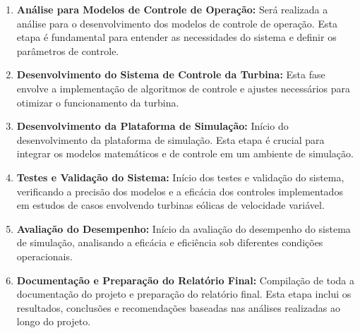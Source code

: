 \begin{enumerate}
    \item \textbf{Análise para Modelos de Controle de Operação:} Será realizada a análise para o desenvolvimento dos modelos de controle de operação. Esta etapa é fundamental para entender as necessidades do sistema e definir os parâmetros de controle. 
    \item \textbf{Desenvolvimento do Sistema de Controle da Turbina:} Esta fase envolve a implementação de algoritmos de controle e ajustes necessários para otimizar o funcionamento da turbina.
    \item \textbf{Desenvolvimento da Plataforma de Simulação:} Início do desenvolvimento da plataforma de simulação. Esta etapa é crucial para integrar os modelos matemáticos e de controle em um ambiente de simulação.
    \item \textbf{Testes e Validação do Sistema:} Início dos testes e validação do sistema, verificando a precisão dos modelos e a eficácia dos controles implementados em estudos de casos envolvendo turbinas eólicas de velocidade variável.
    \item \textbf{Avaliação do Desempenho:} Início da avaliação do desempenho do sistema de simulação, analisando a eficácia e eficiência sob diferentes condições operacionais.
    \item \textbf{Documentação e Preparação do Relatório Final:} Compilação de toda a documentação do projeto e preparação do relatório final. Esta etapa inclui os resultados, conclusões e recomendações baseadas nas análises realizadas ao longo do projeto.
\end{enumerate}










